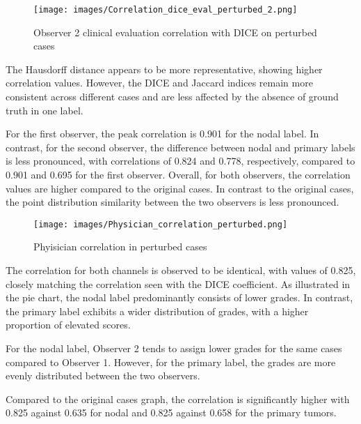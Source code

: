 \begin{figure}[ht]
    \centering
    \texttt{[image: images/Correlation\_dice\_eval\_perturbed\_2.png]}
    \caption{Observer 2 clinical evaluation correlation with DICE on perturbed cases}
    \label{fig:three_subfigures}
\end{figure}


The Hausdorff distance appears to be more representative, showing higher correlation values. However, the DICE and Jaccard indices remain more consistent across different cases and are less affected by the absence of ground truth in one label.

For the first observer, the peak correlation is 0.901 for the nodal label. In contrast, for the second observer, the difference between nodal and primary labels is less pronounced, with correlations of 0.824 and 0.778, respectively, compared to 0.901 and 0.695 for the first observer. Overall, for both observers, the correlation values are higher compared to the original cases.
In contrast to the original cases, the point distribution similarity between the two observers is less pronounced.

\newpage
\begin{figure}[ht]
    \centering
    \texttt{[image: images/Physician\_correlation\_perturbed.png]}
    \caption{Phyisician correlation in perturbed cases}
    \label{fig:three_subfigures}
\end{figure}

The correlation for both channels is observed to be identical, with values of 0.825, closely matching the correlation seen with the DICE coefficient. As illustrated in the pie chart, the nodal label predominantly consists of lower grades. In contrast, the primary label exhibits a wider distribution of grades, with a higher proportion of elevated scores.

For the nodal label, Observer 2 tends to assign lower grades for the same cases compared to Observer 1. However, for the primary label, the grades are more evenly distributed between the two observers.

Compared to the original cases graph, the correlation is significantly higher with 0.825 against 0.635 for nodal and 0.825 against 0.658 for the primary tumors.



